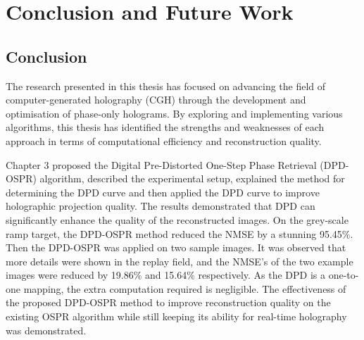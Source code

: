 
\chapter{Conclusion and Future Work}
\section{Conclusion}
The research presented in this thesis has focused on advancing the field of computer-generated holography (CGH) through the development and optimisation of phase-only holograms. By exploring and implementing various algorithms, this thesis has identified the strengths and weaknesses of each approach in terms of computational efficiency and reconstruction quality.

Chapter 3 proposed the Digital Pre-Distorted One-Step Phase Retrieval (DPD-OSPR) algorithm, described the experimental setup, explained the method for determining the DPD curve and then applied the DPD curve to improve holographic projection quality. The results demonstrated that DPD can significantly enhance the quality of the reconstructed images. On the grey-scale ramp target, the DPD-OSPR method reduced the NMSE by a stunning 95.45\%. Then the DPD-OSPR was applied on two sample images. It was observed that more details were shown in the replay field, and the NMSE's of the two example images were reduced by 19.86\% and 15.64\% respectively. As the DPD is a one-to-one mapping, the extra computation required is negligible. The effectiveness of the proposed DPD-OSPR method to improve reconstruction quality on the existing OSPR algorithm while still keeping its ability for real-time holography was demonstrated.

